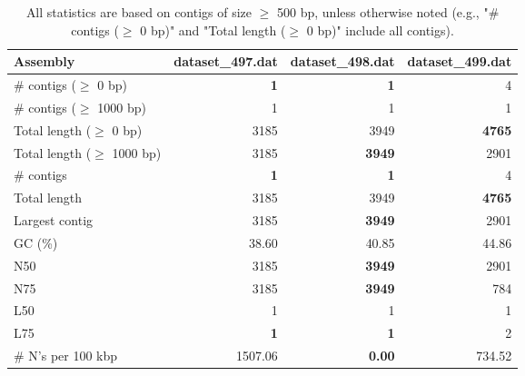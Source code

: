 \documentclass[12pt,a4paper]{article}
\begin{document}
\begin{table}[ht]
\begin{center}
\caption{All statistics are based on contigs of size $\geq$ 500 bp, unless otherwise noted (e.g., "\# contigs ($\geq$ 0 bp)" and "Total length ($\geq$ 0 bp)" include all contigs).}
\begin{tabular}{|l*{3}{|r}|}
\hline
Assembly & dataset\_497.dat & dataset\_498.dat & dataset\_499.dat \\ \hline
\# contigs ($\geq$ 0 bp) & {\bf 1} & {\bf 1} & 4 \\ \hline
\# contigs ($\geq$ 1000 bp) & 1 & 1 & 1 \\ \hline
Total length ($\geq$ 0 bp) & 3185 & 3949 & {\bf 4765} \\ \hline
Total length ($\geq$ 1000 bp) & 3185 & {\bf 3949} & 2901 \\ \hline
\# contigs & {\bf 1} & {\bf 1} & 4 \\ \hline
Total length & 3185 & 3949 & {\bf 4765} \\ \hline
Largest contig & 3185 & {\bf 3949} & 2901 \\ \hline
GC (\%) & 38.60 & 40.85 & 44.86 \\ \hline
N50 & 3185 & {\bf 3949} & 2901 \\ \hline
N75 & 3185 & {\bf 3949} & 784 \\ \hline
L50 & 1 & 1 & 1 \\ \hline
L75 & {\bf 1} & {\bf 1} & 2 \\ \hline
\# N's per 100 kbp & 1507.06 & {\bf 0.00} & 734.52 \\ \hline
\end{tabular}
\end{center}
\end{table}
\end{document}
